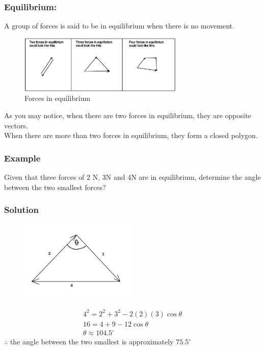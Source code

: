 \documentclass{article}
\begin{document}
\subsubsection{Equilibrium:} A group of forces is said to be in equilibrium when there is no movement.
\begin{figure}[h]
    \centering
    \includegraphics[width=0.7\textwidth]{imgs/equilibrium.png}
    \caption{Forces in equilibrium}
\end{figure}

As you may notice, when there are two forces in equilibrium, they are opposite vectors.\\
When there are more than two forces in equilibrium, they form a closed polygon.
\subsubsection*{Example}
Given that three forces of 2 N, 3N and 4N are in equilibrium, determine the angle between the two smallest forces?
\subsubsection*{Solution}
\begin{figure}[h]
    \centering
    \includegraphics[width=0.5\textwidth]{imgs/force_2.png}
\end{figure}
\begin{align*}
    4^2=2^2+3^2-2(2)(3)\cos \theta\\
    16=4+9-12\cos \theta\\
    \theta \approx 104.5^{\circ}
\end{align*}
$\therefore$ the angle between the two smallest is approximately $75.5^{\circ}$
\newpage 
\end{document}
